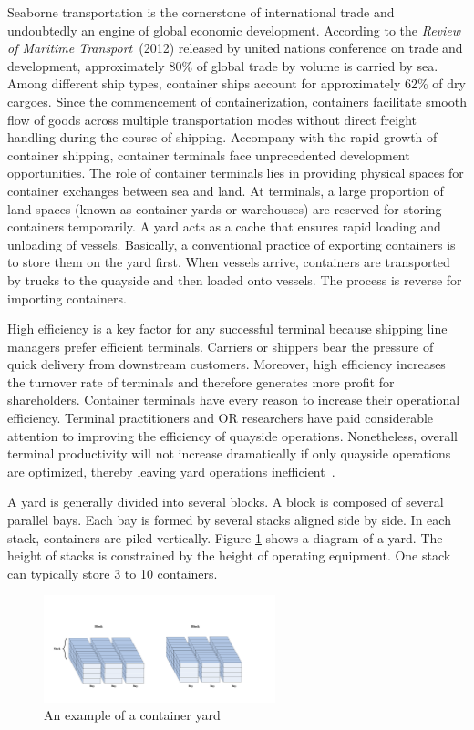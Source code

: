 \documentclass[review,3p,times,authoryear,12pt]{elsarticle}
\begin{document}
Seaborne transportation is the cornerstone of international trade and undoubtedly an engine of global economic development. According to the \textit{Review of Maritime Transport}~(2012) released by united nations conference on trade and development, approximately 80\% of global trade by volume is carried by sea. Among different ship types, container ships account for approximately 62\% of dry cargoes. Since the commencement of containerization, containers facilitate smooth flow of goods across multiple transportation modes without direct freight handling during the course of shipping. Accompany with the rapid growth of container shipping, container terminals face unprecedented development opportunities.
The role of container terminals lies in providing physical spaces for container exchanges between sea and land. At terminals, a large proportion of land spaces (known as container yards or warehouses) are reserved for storing containers temporarily. A yard acts as a cache that ensures rapid loading and unloading of vessels. Basically, a conventional practice of exporting containers is to store them on the yard first. When vessels arrive, containers are transported by trucks to the quayside and then loaded onto vessels. The process is reverse for importing containers.

High efficiency is a key factor for any successful terminal because shipping line managers prefer efficient terminals. Carriers or shippers bear the pressure of quick delivery from downstream customers. Moreover, high efficiency increases the turnover rate of terminals and therefore generates more profit for shareholders. Container terminals have every reason to increase their operational efficiency. Terminal practitioners and OR researchers have paid considerable attention to improving the efficiency of quayside operations. Nonetheless, overall terminal productivity will not increase dramatically if only quayside operations are optimized, thereby leaving yard operations inefficient~\citep{Jiang2012}.

A yard is generally divided into several blocks. A block is composed of several parallel bays. Each bay is formed by several stacks aligned side by side. In each stack, containers are piled vertically. Figure \ref{fig:1} shows a diagram of a yard. The height of stacks is constrained by the height of operating equipment. One stack can typically store 3 to 10 containers.

\begin{figure}[htbp]
\centering
\includegraphics[width=0.60\textwidth]{fig1.pdf}
\caption{An example of a container yard}
\label{fig:1}
\end{figure}
\end{document}

